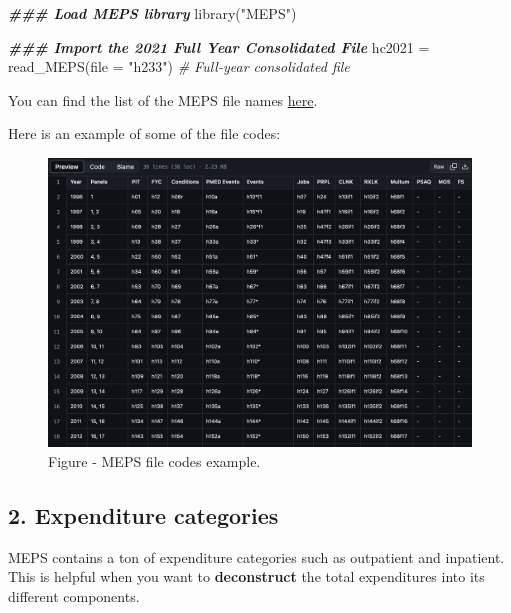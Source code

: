 \documentclass[
]{book}
\newenvironment{Shaded}{\begin{snugshade}}{\end{snugshade}}
\newcommand{\AttributeTok}[1]{\textcolor[rgb]{0.77,0.63,0.00}{#1}}
\newcommand{\CommentTok}[1]{\textcolor[rgb]{0.56,0.35,0.01}{\textit{#1}}}
\newcommand{\DocumentationTok}[1]{\textcolor[rgb]{0.56,0.35,0.01}{\textbf{\textit{#1}}}}
\newcommand{\FunctionTok}[1]{\textcolor[rgb]{0.00,0.00,0.00}{#1}}
\newcommand{\NormalTok}[1]{#1}
\newcommand{\OtherTok}[1]{\textcolor[rgb]{0.56,0.35,0.01}{#1}}
\newcommand{\StringTok}[1]{\textcolor[rgb]{0.31,0.60,0.02}{#1}}
\begin{document}
\begin{Shaded}
\begin{Highlighting}[]
\DocumentationTok{\#\#\# Load MEPS library}
\FunctionTok{library}\NormalTok{(}\StringTok{"MEPS"}\NormalTok{)}

\DocumentationTok{\#\#\# Import the 2021 Full Year Consolidated File}
\NormalTok{hc2021 }\OtherTok{=} \FunctionTok{read\_MEPS}\NormalTok{(}\AttributeTok{file =} \StringTok{"h233"}\NormalTok{) }\CommentTok{\# Full{-}year consolidated file}
\end{Highlighting}
\end{Shaded}

You can find the list of the MEPS file names \href{https://github.com/HHS-AHRQ/MEPS/blob/master/Quick_Reference_Guides/meps_file_names.csv}{here}.

Here is an example of some of the file codes:

\begin{figure}
\includegraphics[width=1\linewidth]{Figure 7_2 - MEPS - File codes} \caption{Figure - MEPS file codes example.}\label{fig:unnamed-chunk-97}
\end{figure}

\hypertarget{expenditure-categories}{%
\subsection{2. Expenditure categories}\label{expenditure-categories}}

MEPS contains a ton of expenditure categories such as outpatient and inpatient. This is helpful when you want to \textbf{deconstruct} the total expenditures into its different components.
\end{document}

